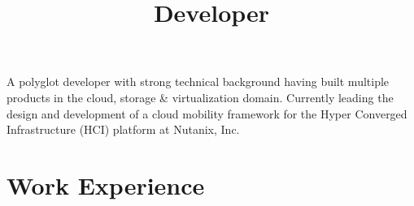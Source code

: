 \documentclass[11pt,a4paper,roman]{moderncv}        %
\title{Developer}                               %
\begin{document}
\makecvtitle

\small{A polyglot developer with strong technical background having built multiple products in the cloud, storage
\& virtualization domain. Currently leading
the design and development of a cloud mobility framework for the Hyper Converged Infrastructure (HCI) platform at Nutanix, Inc.}

\section{Work Experience}

\vspace{6pt}
\end{document}
